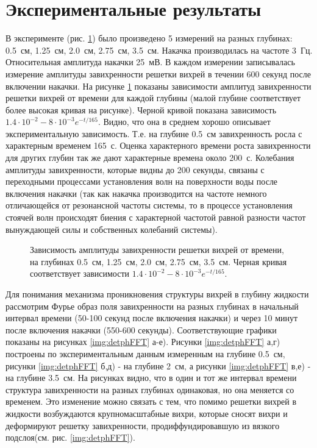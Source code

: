 \section{Экспериментальные результаты} \label{sect6_3}

В эксперименте (рис. \ref{img:5deeps}) было произведено 5 измерений на разных глубинах: 0.5~см, 1.25~см, 2.0~см, 2.75~см, 3.5~см. Накачка производилась на частоте 3~Гц. Относительная амплитуда накачки 25~мВ. В каждом измерении записывалась измерение амплитуды завихренности решетки вихрей в течении 600 секунд после включении накачки. На рисунке \ref{img:5deeps} показаны зависимости амплитуд завихренности решетки вихрей от времени для каждой глубины (малой глубине соответствует более высокая кривая на рисунке). Черной кривой показана зависимость $1.4 \cdot 10^{-2} - 8 \cdot 10^{-3} e^{-t/165}$. Видно, что она в среднем хорошо описывает экспериментальную зависимость. Т.е. на глубине 0.5~см завихренность росла с характерным временем 165~с. Оценка характерного времени роста завихренности для других глубин так же дают характерные времена около 200~с. Колебания амплитуды завихренности, которые видны до 200 секунды, связаны с переходными процессами установления волн на поверхности воды после включения накачки (так как накачка производится на частоте немного отличающейся от резонансной частоты системы, то в процессе установления стоячей волн происходят биения с характерной частотой равной разности частот вынуждающей силы и собственных колебаний системы).

\begin{figure}[ht]
 \caption{Зависимость амплитуды завихренности решетки вихрей от времени, на глубинах 0.5~см, 1.25~см, 2.0~см, 2.75~см, 3.5~см. Черная кривая соответствует зависимости $1.4 \cdot 10^{-2} - 8 \cdot 10^{-3} e^{-t/165}$.}
 \label{img:5deeps} 
\end{figure}

Для понимания механизма проникновения структуры вихрей в глубину жидкости рассмотрим Фурье образ поля завихренности на разных глубинах в начальный интервал времени (50-100 секунд после включения накачки) и через 10 минут после включения накачки (550-600 секунды). Соответствующие графики показаны на рисунках \ref{img:detphFFT} а-е). Рисунки \ref{img:detphFFT} а,г) построены по экспериментальным данным измеренным на глубине 0.5~см, рисунки \ref{img:detphFFT} б,д) - на глубине 2~см, а рисунки \ref{img:detphFFT} в,е) - на глубине 3.5~см. На рисунках видно, что в один и тот же интервал времени структура завихренности на разных глубинах одинаковая, но она меняется со временем. Это изменение можно связать с тем, что помимо решетки вихрей в жидкости возбуждаются крупномасштабные вихри, которые сносят вихри и деформируют решетку завихренности, продиффундировавшую из вязкого подслоя(см. рис. \ref{img:detphFFT}).

